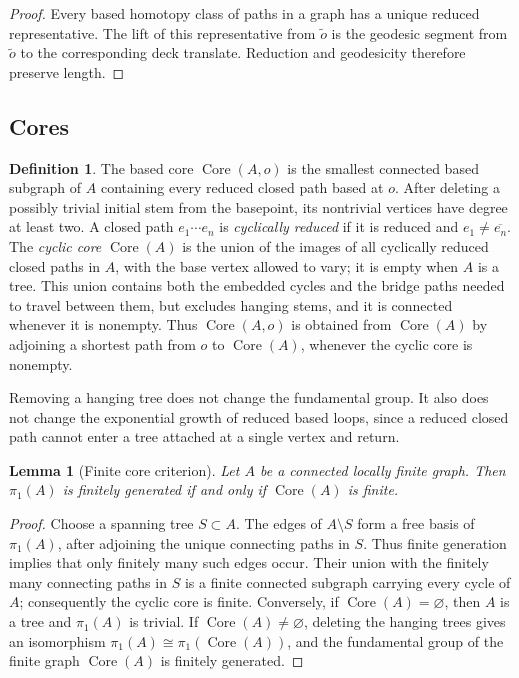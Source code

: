 \documentclass[11pt]{amsart}
\theoremstyle{plain}
\newtheorem{lemma}[theorem]{Lemma}
\theoremstyle{definition}
\newtheorem{definition}[theorem]{Definition}
\theoremstyle{remark}
\newcommand{\Core}{\operatorname{Core}}
\begin{document}
\begin{proof}
Every based homotopy class of paths in a graph has a unique reduced
representative.  The lift of this representative from \(\widetilde o\) is the
geodesic segment from \(\widetilde o\) to the corresponding deck translate.
Reduction and geodesicity therefore preserve length.
\end{proof}

\subsection{Cores}

\begin{definition}
The based core \(\Core(A,o)\) is the smallest connected based subgraph of
\(A\) containing every reduced closed path based at \(o\).  After deleting a
possibly trivial initial stem from the basepoint, its nontrivial vertices
have degree at least two.  A closed path \(e_1\cdots e_n\) is
\emph{cyclically reduced} if it is reduced and
\(e_1\neq\overline{e_n}\).  The \emph{cyclic core} \(\Core(A)\) is the union
of the images of all cyclically reduced closed paths in \(A\), with the base
vertex allowed to vary; it is empty when \(A\) is a tree.  This union contains
both the embedded cycles and the bridge paths needed to travel between them,
but excludes hanging stems, and it is connected whenever it is nonempty.
Thus \(\Core(A,o)\) is obtained from \(\Core(A)\) by adjoining a shortest path
from \(o\) to \(\Core(A)\), whenever the cyclic core is nonempty.
\end{definition}

Removing a hanging tree does not change the fundamental group.  It also does
not change the exponential growth of reduced based loops, since a reduced
closed path cannot enter a tree attached at a single vertex and return.

\begin{lemma}[Finite core criterion]\label{lem:finite-core}
Let \(A\) be a connected locally finite graph.  Then \(\pi_1(A)\) is finitely
generated if and only if \(\Core(A)\) is finite.
\end{lemma}

\begin{proof}
Choose a spanning tree \(S\subset A\).  The edges of \(A\setminus S\) form a
free basis of \(\pi_1(A)\), after adjoining the unique connecting paths in
\(S\).  Thus finite generation implies that only finitely many such edges
occur.  Their union with the finitely many connecting paths in \(S\) is a
finite connected subgraph carrying every cycle of \(A\); consequently the
cyclic core is finite.  Conversely, if \(\Core(A)=\varnothing\), then \(A\)
is a tree and \(\pi_1(A)\) is trivial.  If \(\Core(A)\neq\varnothing\),
deleting the hanging trees gives an isomorphism
\(\pi_1(A)\cong\pi_1(\Core(A))\), and the fundamental group of the finite
graph \(\Core(A)\) is finitely generated.
\end{proof}
\end{document}
